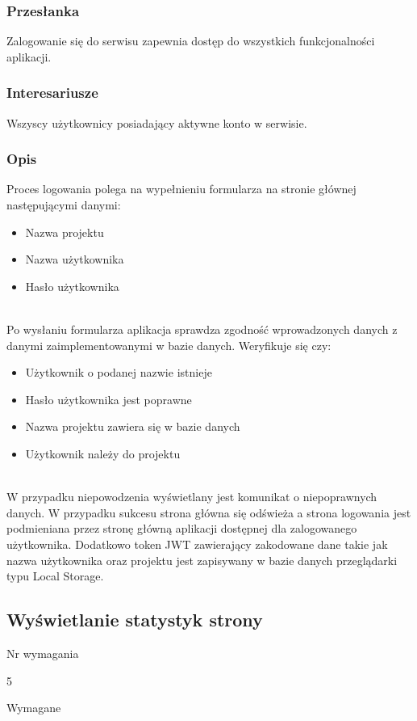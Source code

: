 \documentclass[eng,printmode]{mgr}
\begin{document}
\subsubsection{Przesłanka}
Zalogowanie się do serwisu zapewnia dostęp do wszystkich funkcjonalności aplikacji.

\subsubsection{Interesariusze}
Wszyscy użytkownicy posiadający aktywne konto w serwisie.

\subsubsection{Opis}
Proces logowania polega na wypełnieniu formularza na stronie głównej następującymi danymi:
\begin{itemize}
	\item[--] Nazwa projektu
	\item[--] Nazwa użytkownika
	\item[--] Hasło użytkownika
\end{itemize}
\ \\
Po wysłaniu formularza aplikacja sprawdza zgodność wprowadzonych danych z danymi zaimplementowanymi w bazie danych. Weryfikuje się czy:
\begin{itemize}
	\item[--] Użytkownik o podanej nazwie istnieje
	\item[--] Hasło użytkownika jest poprawne
	\item[--] Nazwa projektu zawiera się w bazie danych
	\item[--] Użytkownik należy do projektu
\end{itemize}
\ \\
W przypadku niepowodzenia wyświetlany jest komunikat o niepoprawnych danych. W przypadku sukcesu strona główna się odświeża a strona logowania jest podmieniana przez stronę główną aplikacji dostępnej dla zalogowanego użytkownika. Dodatkowo token JWT zawierający zakodowane dane takie jak nazwa użytkownika oraz projektu jest zapisywany w bazie danych przeglądarki typu Local Storage\cite {Keyword_LocaLStorage}.

\subsection{Wyświetlanie statystyk strony}
\begin{labeling}{Nr wymagania}
\item [Nr wymagania:] 5
\item [Priorytet:] Wymagane
\end{labeling}
\end{document}

